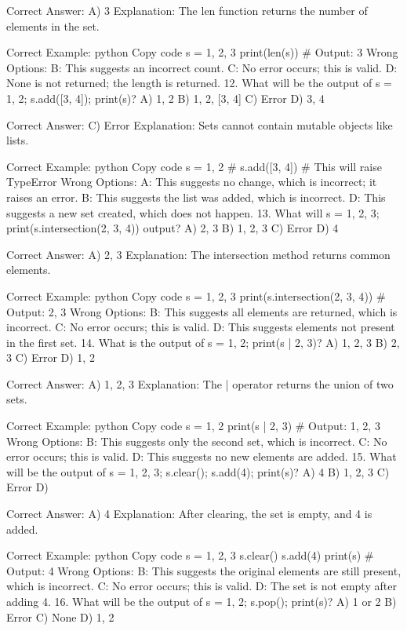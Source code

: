 Correct Answer: A) 3
Explanation: The len function returns the number of elements in the set.

Correct Example:
python
Copy code
s = {1, 2, 3}
print(len(s))  # Output: 3
Wrong Options:
B: This suggests an incorrect count.
C: No error occurs; this is valid.
D: None is not returned; the length is returned.
12. What will be the output of s = {1, 2}; s.add([3, 4]); print(s)?
A) {1, 2}
B) {1, 2, [3, 4]}
C) Error
D) {3, 4}

Correct Answer: C) Error
Explanation: Sets cannot contain mutable objects like lists.

Correct Example:
python
Copy code
s = {1, 2}
# s.add([3, 4])  # This will raise TypeError
Wrong Options:
A: This suggests no change, which is incorrect; it raises an error.
B: This suggests the list was added, which is incorrect.
D: This suggests a new set created, which does not happen.
13. What will s = {1, 2, 3}; print(s.intersection({2, 3, 4})) output?
A) {2, 3}
B) {1, 2, 3}
C) Error
D) {4}

Correct Answer: A) {2, 3}
Explanation: The intersection method returns common elements.

Correct Example:
python
Copy code
s = {1, 2, 3}
print(s.intersection({2, 3, 4}))  # Output: {2, 3}
Wrong Options:
B: This suggests all elements are returned, which is incorrect.
C: No error occurs; this is valid.
D: This suggests elements not present in the first set.
14. What is the output of s = {1, 2}; print(s | {2, 3})?
A) {1, 2, 3}
B) {2, 3}
C) Error
D) {1, 2}

Correct Answer: A) {1, 2, 3}
Explanation: The | operator returns the union of two sets.

Correct Example:
python
Copy code
s = {1, 2}
print(s | {2, 3})  # Output: {1, 2, 3}
Wrong Options:
B: This suggests only the second set, which is incorrect.
C: No error occurs; this is valid.
D: This suggests no new elements are added.
15. What will be the output of s = {1, 2, 3}; s.clear(); s.add(4); print(s)?
A) {4}
B) {1, 2, 3}
C) Error
D) {}

Correct Answer: A) {4}
Explanation: After clearing, the set is empty, and 4 is added.

Correct Example:
python
Copy code
s = {1, 2, 3}
s.clear()
s.add(4)
print(s)  # Output: {4}
Wrong Options:
B: This suggests the original elements are still present, which is incorrect.
C: No error occurs; this is valid.
D: The set is not empty after adding 4.
16. What will be the output of s = {1, 2}; s.pop(); print(s)?
A) {1} or {2}
B) Error
C) None
D) {1, 2}

